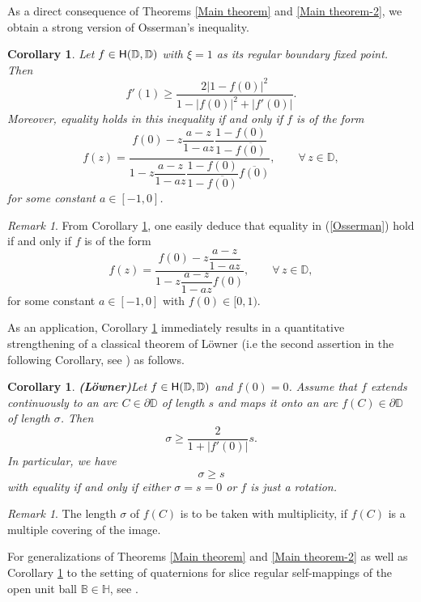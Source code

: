\documentclass{amsart}
\newtheorem{corollary}[theorem]{Corollary}
\theoremstyle{definition}
\theoremstyle{remark}
\newtheorem{remark}[theorem]{Remark}
\numberwithin{equation}{section}
\begin{document}
As a direct consequence of Theorems \ref{Main theorem} and \ref{Main theorem-2}, we obtain a strong version of Osserman's inequality.
\begin{corollary}\label{Main corollary}
 Let $f\in {\rm{\textsf{H}}}(\mathbb D, \mathbb D)$  with $\xi=1$ as its  regular  boundary  fixed  point. Then
 \begin{equation}\label{inequality from below}
f'(1)\geq\frac{2\big|1-f(0)\big|^2}{1-|f(0)|^2+|f'(0)|}.
 \end{equation}
 Moreover, equality holds in this inequality if and only if $f$ is of the form
\begin{equation}\label{exe-funs}
f(z)=\dfrac{f(0)-z\dfrac{a-z}{1-az}\dfrac{1-f(0)}{1-\overline{f(0)}}}{1-z\dfrac{a-z}{1-az}
\dfrac{1-f(0)}{1-\overline{f(0)}}\overline{f(0)}},\qquad \forall\,z\in\mathbb D,
\end{equation}
for some constant $a\in [-1,0]$.
\end{corollary}


\begin{remark}\label{Main remark}
From Corollary \ref{Main corollary}, one easily deduce that equality in (\ref{Osserman}) hold if and only if $f$ is of the form
$$f(z)=\dfrac{f(0)-z\dfrac{a-z}{1-az}}{1-z\dfrac{a-z}{1-az}f(0)}, \qquad \forall\,z\in\mathbb D,$$
for some constant $a\in [-1,0]$ with $f(0)\in \mathbb [0,1)$.
\end{remark}


As an application, Corollary \ref{Main corollary}  immediately results in a quantitative strengthening of a classical theorem of L\"{o}wner (i.e  the second assertion in the following Corollary, see \cite{Lowner}) as follows.
\begin{corollary} {\bf(L\"{o}wner)}\label{thm:Lowner}
Let $f\in {\rm{\textsf{H}}}(\mathbb D, \mathbb D)$ and $f(0)=0$. Assume that $f$ extends continuously to an arc $C\in\partial\mathbb D$ of length $s$ and maps it onto an arc $f(C)\in\partial\mathbb D$ of length $\sigma$. Then
$$\sigma\geq\frac{2}{1+|f'(0)|}s.$$
In particular, we have
\begin{equation}\label{Lowner ineq}
\sigma\geq s
\end{equation}
with equality if and only if either $\sigma=s=0$ or $f$ is just a rotation.
\end{corollary}

\begin{remark}
The length $\sigma$ of $f(C)$ is to be taken with multiplicity, if $f(C)$ is a multiple covering of the image.
\end{remark}
For generalizations of Theorems \ref{Main theorem} and \ref{Main theorem-2} as well as  Corollary \ref{Main corollary} to the setting of quaternions for slice regular self-mappings of the open unit ball $\mathbb B\in\mathbb H$, see \cite{RW}.
\end{document}
